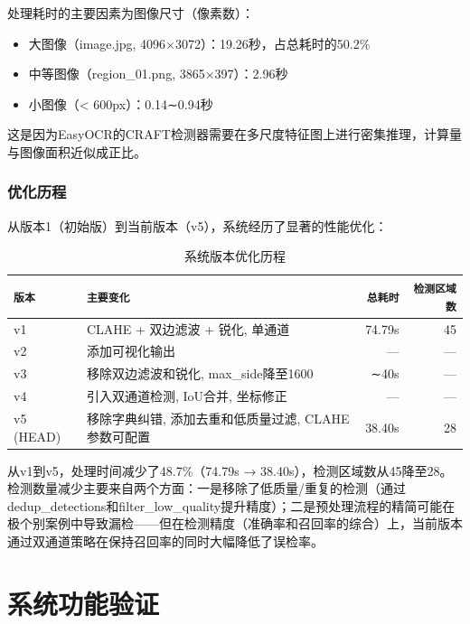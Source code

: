\documentclass[12pt,hyperref,a4paper,UTF8]{ctexart}
\begin{document}
处理耗时的主要因素为图像尺寸（像素数）：

\begin{itemize}
    \item 大图像（image.jpg, 4096×3072）：19.26秒，占总耗时的50.2\%
    \item 中等图像（region\_01.png, 3865×397）：2.96秒
    \item 小图像（< 600px）：0.14∼0.94秒
\end{itemize}

这是因为EasyOCR的CRAFT检测器需要在多尺度特征图上进行密集推理，计算量与图像面积近似成正比。

\subsubsection{优化历程}

从版本1（初始版）到当前版本（v5），系统经历了显著的性能优化：

\begin{table}[!htbp]
    \centering
    \begin{tabular}{l|l|r|r}
        \hline
        \texttt{版本} & \texttt{主要变化} & \texttt{总耗时} & \texttt{检测区域数} \\
        \hline
        v1 & CLAHE + 双边滤波 + 锐化, 单通道 & 74.79s & 45 \\
        v2 & 添加可视化输出 & — & — \\
        v3 & 移除双边滤波和锐化, max\_side降至1600 & ∼40s & — \\
        v4 & 引入双通道检测, IoU合并, 坐标修正 & — & — \\
        v5 (HEAD) & 移除字典纠错, 添加去重和低质量过滤, CLAHE参数可配置 & 38.40s & 28 \\
        \hline
    \end{tabular}
    \caption{系统版本优化历程}
    \label{tab:versions}
\end{table}

从v1到v5，处理时间减少了48.7\%（74.79s → 38.40s），检测区域数从45降至28。检测数量减少主要来自两个方面：一是移除了低质量/重复的检测（通过dedup\_detections和filter\_low\_quality提升精度）；二是预处理流程的精简可能在极个别案例中导致漏检——但在检测精度（准确率和召回率的综合）上，当前版本通过双通道策略在保持召回率的同时大幅降低了误检率。

\clearpage

\section{系统功能验证}
\end{document}
